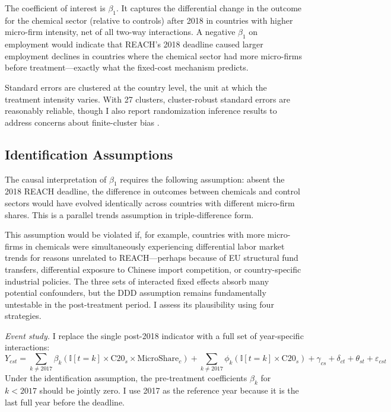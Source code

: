 \documentclass[12pt]{article}
\newcommand{\ind}{\mathbb{I}}
\begin{document}
The coefficient of interest is $\beta_1$. It captures the differential change in the outcome for the chemical sector (relative to controls) after 2018 in countries with higher micro-firm intensity, net of all two-way interactions. A negative $\beta_1$ on employment would indicate that REACH's 2018 deadline caused larger employment declines in countries where the chemical sector had more micro-firms before treatment---exactly what the fixed-cost mechanism predicts.

Standard errors are clustered at the country level, the unit at which the treatment intensity varies. With 27 clusters, cluster-robust standard errors are reasonably reliable, though I also report randomization inference results to address concerns about finite-cluster bias \citep{cameron2008}.

\subsection{Identification Assumptions}

The causal interpretation of $\beta_1$ requires the following assumption: absent the 2018 REACH deadline, the difference in outcomes between chemicals and control sectors would have evolved identically across countries with different micro-firm shares. This is a parallel trends assumption in triple-difference form.

This assumption would be violated if, for example, countries with more micro-firms in chemicals were simultaneously experiencing differential labor market trends for reasons unrelated to REACH---perhaps because of EU structural fund transfers, differential exposure to Chinese import competition, or country-specific industrial policies. The three sets of interacted fixed effects absorb many potential confounders, but the DDD assumption remains fundamentally untestable in the post-treatment period. I assess its plausibility using four strategies.

\textit{Event study.} I replace the single post-2018 indicator with a full set of year-specific interactions:
\begin{equation}
\label{eq:eventstudy}
Y_{cst} = \sum_{k \neq 2017} \beta_k \left(\ind[t = k] \times \text{C20}_s \times \text{MicroShare}_c\right) + \sum_{k \neq 2017} \phi_k \left(\ind[t = k] \times \text{C20}_s\right) + \gamma_{cs} + \delta_{ct} + \theta_{st} + \varepsilon_{cst}
\end{equation}
Under the identification assumption, the pre-treatment coefficients $\beta_k$ for $k < 2017$ should be jointly zero. I use 2017 as the reference year because it is the last full year before the deadline.
\end{document}
